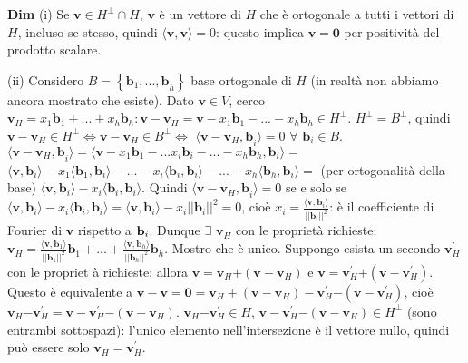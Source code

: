 \documentclass{article}
\begin{document}
\textbf{Dim} (i) Se $\mathbf{v}\in H^{\perp }\cap H$, $\mathbf{v}$ \`{e} un
vettore di $H$ che \`{e} ortogonale a tutti i vettori di $H$, incluso se
stesso, quindi $\langle \mathbf{v,v}\rangle =0$: questo implica $\mathbf{v=0}
$ per positivit\`{a} del prodotto scalare.

(ii) Considero $B=\left\{ \mathbf{b}_{1}\mathbf{,...,b}_{h}\right\} $ base
ortogonale di $H$ (in realt\`{a} non abbiamo ancora mostrato che esiste).
Dato $\mathbf{v}\in V$, cerco $\mathbf{v}_{H}=x_{1}\mathbf{b}_{1}+...+x_{h}%
\mathbf{b}_{h}:\mathbf{v-v}_{H}=\mathbf{v}-x_{1}\mathbf{b}_{1}-...-x_{h}%
\mathbf{b}_{h}\in H^{\perp }$. $H^{\perp }=B^{\perp }$, quindi $\mathbf{v-v}%
_{H}\in H^{\perp }\Longleftrightarrow \mathbf{v-v}_{H}\in B^{\perp
}\Longleftrightarrow $ $\langle \mathbf{v-v}_{H}\mathbf{,b}_{i}\rangle =0$ $%
\forall $ $\mathbf{b}_{i}\in B$. $\langle \mathbf{v-v}_{H}\mathbf{,b}%
_{i}\rangle =\langle \mathbf{v}-x_{1}\mathbf{b}_{1}-...x_{i}\mathbf{b}%
_{i}-...-x_{h}\mathbf{b}_{h},\mathbf{b}_{i}\rangle =$ $\langle \mathbf{v},%
\mathbf{b}_{i}\rangle -x_{1}\langle \mathbf{b}_{1},\mathbf{b}_{i}\rangle
-...-x_{i}\langle \mathbf{b}_{i},\mathbf{b}_{i}\rangle -...-x_{h}\langle 
\mathbf{b}_{h},\mathbf{b}_{i}\rangle =$ (per ortogonalit\`{a} della base) $%
\langle \mathbf{v},\mathbf{b}_{i}\rangle -x_{i}\langle \mathbf{b}_{i},%
\mathbf{b}_{i}\rangle $. Quindi $\langle \mathbf{v-v}_{H}\mathbf{,b}%
_{i}\rangle =0$ se e solo se $\langle \mathbf{v},\mathbf{b}_{i}\rangle
-x_{i}\langle \mathbf{b}_{i},\mathbf{b}_{i}\rangle =\langle \mathbf{v},%
\mathbf{b}_{i}\rangle -x_{i}\left\vert \left\vert \mathbf{b}_{i}\right\vert
\right\vert ^{2}=0$, cio\`{e} $x_{i}=\frac{\langle \mathbf{v},\mathbf{b}%
_{i}\rangle }{\left\vert \left\vert \mathbf{b}_{i}\right\vert \right\vert
^{2}}$: \`{e} il coefficiente di Fourier di $\mathbf{v}$ rispetto a $\mathbf{%
b}_{i}$. Dunque $\exists $ $\mathbf{v}_{H}$ con le propriet\`{a} richieste: $%
\mathbf{v}_{H}=\frac{\langle \mathbf{v},\mathbf{b}_{1}\rangle }{\left\vert
\left\vert \mathbf{b}_{1}\right\vert \right\vert ^{2}}\mathbf{b}_{1}+...+%
\frac{\langle \mathbf{v},\mathbf{b}_{h}\rangle }{\left\vert \left\vert 
\mathbf{b}_{h}\right\vert \right\vert ^{2}}\mathbf{b}_{h}$. Mostro che \`{e}
unico. Suppongo esista un secondo $\mathbf{v}_{H}^{\prime }$ con le propriet%
\`{a} richieste: allora $\mathbf{v=v}_{H}\mathbf{+}\left( \mathbf{v-v}%
_{H}\right) $ e $\mathbf{v=v}_{H}^{\prime }\mathbf{+}\left( \mathbf{v-v}%
_{H}^{\prime }\right) $. Questo \`{e} equivalente a $\mathbf{v-v}=\mathbf{0}=%
\mathbf{v}_{H}+\left( \mathbf{v-v}_{H}\right) -\mathbf{v}_{H}^{\prime }%
\mathbf{-}\left( \mathbf{v-v}_{H}^{\prime }\right) $, cio\`{e} $\mathbf{v}%
_{H}\mathbf{-v}_{H}^{\prime }\mathbf{=v-v}_{H}^{\prime }\mathbf{-}\left( 
\mathbf{v-v}_{H}\right) $. $\mathbf{v}_{H}\mathbf{-v}_{H}^{\prime }\in H$, $%
\mathbf{v-v}_{H}^{\prime }\mathbf{-}\left( \mathbf{v-v}_{H}\right) \in
H^{\perp }$ (sono entrambi sottospazi): l'unico elemento nell'intersezione 
\`{e} il vettore nullo, quindi pu\`{o} essere solo $\mathbf{v}_{H}=\mathbf{v}%
_{H}^{\prime }$.
\end{document}

